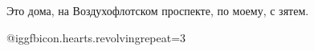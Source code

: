  
 
 
 
 

Это дома, на Воздухофлотском проспекте, по моему, с зятем.

 @igg{fbicon.hearts.revolving}{repeat=3} 
